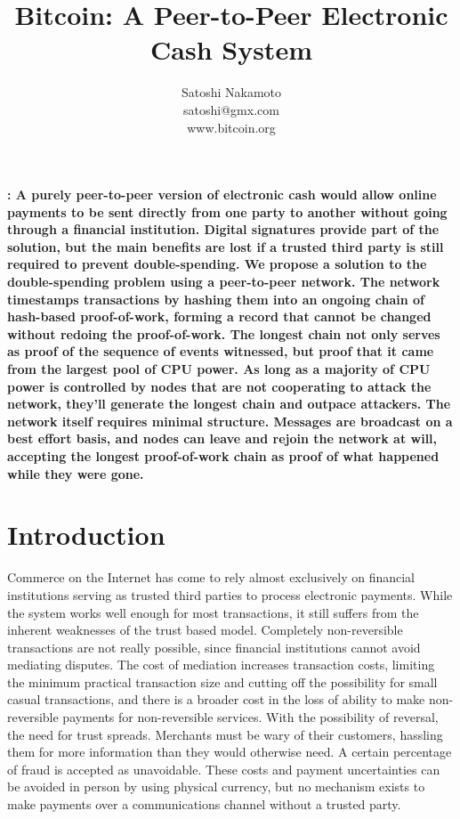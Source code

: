 \documentclass{article}
\title{Bitcoin: A Peer-to-Peer Electronic Cash System}
\author{Satoshi Nakamoto \\ satoshi@gmx.com \\ www.bitcoin.org}
\date{} %
\renewenvironment{abstract}{\noindent\bfseries\abstractname:\normalfont}{}
\begin{document}
\maketitle
\begin{abstract}
    A purely peer-to-peer version of electronic cash would allow online
    payments to be sent directly from one party to another without going through a
    financial institution.
    Digital signatures provide part of the solution, but the main
    benefits are lost if a trusted third party is still required to prevent double-spending.
    We propose a solution to the double-spending problem using a peer-to-peer network.
    The network timestamps transactions by hashing them into an ongoing chain of
    hash-based proof-of-work, forming a record that cannot be changed without redoing
    the proof-of-work.
    The longest chain not only serves as proof of the sequence of
    events witnessed, but proof that it came from the largest pool of CPU power.
    As long as a majority of CPU power is controlled by nodes that are not cooperating to
    attack the network, they'll generate the longest chain and outpace attackers.
    The network itself requires minimal structure.
    Messages are broadcast on a best effort basis, and nodes can leave and rejoin the network at will,
    accepting the longest proof-of-work chain as proof of what happened while they were gone.
\end{abstract}

\section{Introduction}\label{sec:introduction}
Commerce on the Internet has come to rely almost exclusively on financial institutions serving as
trusted third parties to process electronic payments.
While the system works well enough for most transactions, it still suffers from the inherent weaknesses of the trust based model.
Completely non-reversible transactions are not really possible, since financial institutions cannot
avoid mediating disputes.
The cost of mediation increases transaction costs, limiting the
minimum practical transaction size and cutting off the possibility for small casual transactions,
and there is a broader cost in the loss of ability to make non-reversible payments for non-reversible services.
With the possibility of reversal, the need for trust spreads.
Merchants must be wary of their customers, hassling them for more information than they would otherwise need.
A certain percentage of fraud is accepted as unavoidable.
These costs and payment uncertainties can be avoided in person by using physical currency, but no mechanism exists to make payments
over a communications channel without a trusted party.
\end{document}
